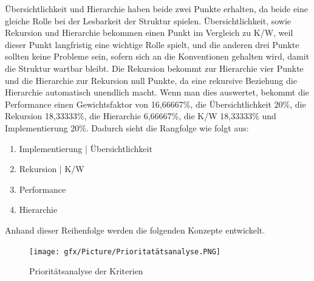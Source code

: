 Übersichtlichkeit und Hierarchie haben beide zwei Punkte erhalten, da beide eine gleiche Rolle bei der Lesbarkeit der Struktur spielen.
Übersichtlichkeit, sowie Rekursion und Hierarchie bekommen einen Punkt im Vergleich zu \ac{K/W}, weil dieser Punkt langfristig eine wichtige Rolle spielt, und die anderen drei Punkte sollten keine Probleme sein, sofern sich an die Konventionen gehalten wird, damit die Struktur wartbar bleibt.
Die Rekursion bekommt zur Hierarchie vier Punkte und die Hierarchie zur Rekursion null Punkte, da eine rekursive Beziehung die Hierarchie automatisch unendlich macht.
\newline
\newline
Wenn man dies auswertet, bekommt die Performance einen Gewichtsfaktor von 16,66667\%, die Übersichtlichkeit 20\%, die Rekursion 18,33333\%, die Hierarchie 6,66667\%, die \ac{K/W} 18,33333\% und Implementierung 20\%.
Dadurch sieht die Rangfolge wie folgt aus:
\begin{enumerate}
	\item Implementierung | Übersichtlichkeit
	\item Rekursion | \ac{K/W}
	\item Performance
	\item Hierarchie
\end{enumerate}
Anhand dieser Reihenfolge werden die folgenden Konzepte entwickelt.
\begin{figure}[h!]
\hspace*{-2cm}
 \centering
 \texttt{[image: gfx/Picture/Prioritatätsanalyse.PNG]}
 \caption{Prioritätsanalyse der Kriterien}
 \label{fig:Prio}
\end{figure}

